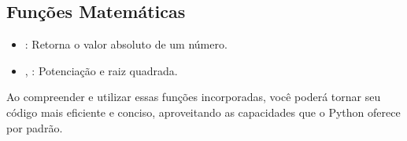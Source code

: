 \documentclass[letterpaper,10pt,english]{jupyterBook}
\begin{document}
\subsection{Funções Matemáticas}
\label{\detokenize{chapters/ch5/ch5:funcoes-matematicas}}\begin{itemize}
\item {} 
\sphinxAtStartPar
{}: Retorna o valor absoluto de um número.

\begin{sphinxVerbatim}[commandchars=\\\{\}]
  
  
\end{sphinxVerbatim}

\begin{sphinxVerbatim}[commandchars=\\\{\}]
    

\end{sphinxVerbatim}

\item {} 
\sphinxAtStartPar
{}, : Potenciação e raiz quadrada.

\begin{sphinxVerbatim}[commandchars=\\\{\}]
   
  
\end{sphinxVerbatim}

\begin{sphinxVerbatim}[commandchars=\\\{\}]
   
\end{sphinxVerbatim}

\end{itemize}

\sphinxAtStartPar
Ao compreender e utilizar essas funções incorporadas, você poderá tornar seu código mais eficiente e conciso, aproveitando as capacidades que o Python oferece por padrão.
\end{document}

